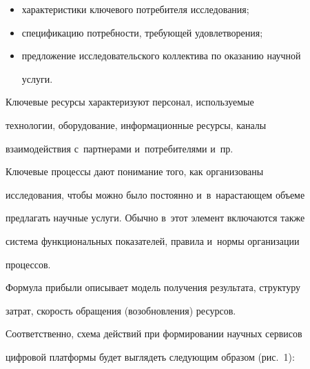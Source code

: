      \begin{itemize}


     \item  характеристики ключевого потребителя исследования;\\[-13.5pt]


     \item спецификацию потребности, требующей удовлетворения;\\[-13.5pt]


\item  предложение исследовательского коллектива по оказанию научной 


услуги.


\end{itemize}





     Ключевые ресурсы характеризуют персонал, используемые 


технологии, обору\-до\-ва\-ние, информационные ресурсы, каналы 


взаимодействия с~партнерами и~потребителями и~пр.


     


     Ключевые процессы дают понимание того, как организованы 


исследования, чтобы можно было постоянно и~в~нарастающем объеме 


предлагать научные услуги. Обычно в~этот элемент включаются также 


система функциональных показателей, правила и~нормы организации 


процессов.


     


     Формула прибыли описывает модель получения результата, структуру 


затрат, скорость обращения (возобновления) ресурсов.


     


     Соответственно, схема действий при формировании научных сервисов 


циф\-ро\-вой платформы будет выглядеть следующим образом (рис.~1): 


